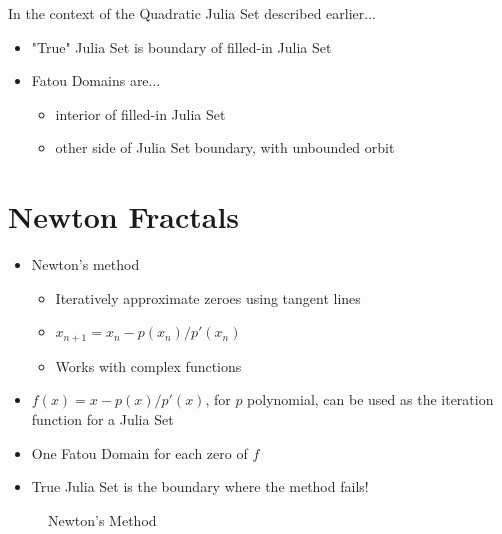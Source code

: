 \documentclass{article}
\begin{document}
In the context of the Quadratic Julia Set described earlier...
\begin{itemize}
    \item "True" Julia Set is boundary of filled-in Julia Set
    \item Fatou Domains are...
        \begin{itemize}
            \item interior of filled-in Julia Set
            \item other side of Julia Set boundary, with unbounded orbit
        \end{itemize}
\end{itemize}


\section{Newton Fractals}

\begin{itemize}
    \item Newton's method
    \begin{itemize}
        \item Iteratively approximate zeroes using tangent lines
        \item $x_{n+1} = x_n - p(x_n)/p'(x_n)$
        \item Works with complex functions
    \end{itemize}
    \item $f(x) = x - p(x)/p'(x)$, for $p$ polynomial, can be used as the iteration function for a Julia Set
    \item One Fatou Domain for each zero of $f$
    \item True Julia Set is the boundary where the method fails!
\end{itemize}


\begin{figure}[!htbp]
    \centering
    \caption{Newton's Method} %
\end{figure}%


%
\end{document}
